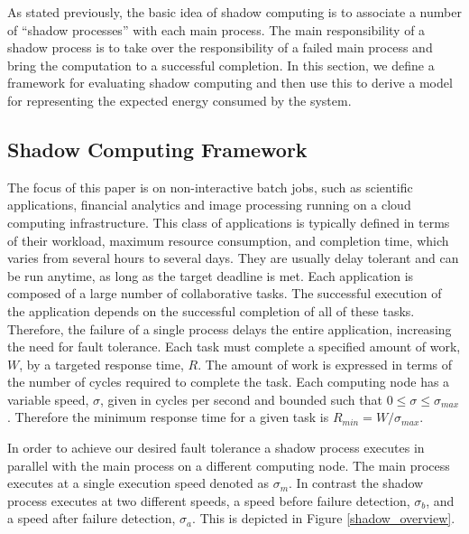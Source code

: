 As stated previously, the basic idea of shadow computing is to
associate a number of ``shadow processes'' with each main process. The
main responsibility of a shadow process is to take over the
responsibility of a failed main process and bring the computation to a
successful completion.  In this section, we define a framework for
evaluating shadow computing and then use this to derive a model for
representing the expected energy consumed by the system. %


\subsection{Shadow Computing Framework}
\label{shadow_computing_framework}

The focus of this paper is on non-interactive batch jobs, such as scientific applications, financial analytics and image processing running on a cloud computing infrastructure. This class of applications is typically defined in terms of their workload, maximum resource consumption, and completion time, which varies from several hours to several days. They are usually delay tolerant and can be run anytime, as long as the target deadline is met. Each
application is composed of a large number of collaborative tasks. The
successful execution of the application depends on the successful
completion of all of these tasks. Therefore, the failure of a single
process delays the entire application, increasing the need for fault
tolerance. Each task must complete a specified amount of work, $W$, by
a targeted response time, $R$. The amount of work is expressed in
terms of the number of cycles required to complete the task. Each
computing node has a variable speed, $\sigma$, given in cycles per
second and bounded such that $0\leq\sigma\leq\sigma_{max}$. Therefore
the minimum response time for a given task is $R_{min}=W/\sigma_{max}$.

In order to achieve our desired fault tolerance a shadow process
executes in parallel with the main process on a different computing
node. The main process executes at a single execution speed denoted as
$\sigma_m$. In contrast the shadow process executes at two different
speeds, a speed before failure detection, $\sigma_b$, and a speed
after failure detection, $\sigma_a$. This is depicted in Figure
\ref{shadow_overview}.

